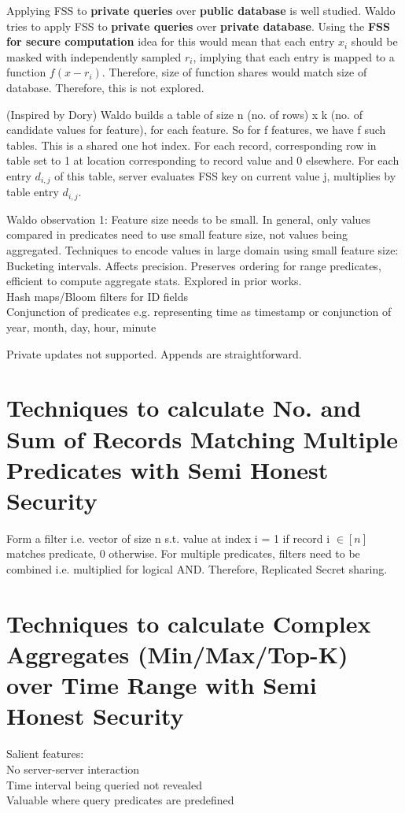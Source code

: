 Applying FSS to \textbf{private queries} over \textbf{public database} is well studied. Waldo tries to apply FSS to \textbf{private queries} over \textbf{private database}. Using the \textbf{FSS for secure computation} idea for this would mean that each entry $x_i$ should be masked with independently sampled $r_i$, implying that each entry is mapped to a function $f(x-r_i)$. Therefore, size of function shares would match size of database. Therefore, this is not explored.

(Inspired by Dory) Waldo builds a table of size n (no. of rows) x k (no. of candidate values for feature), for each feature. So for f features, we have f such tables. This is a shared one hot index. For each record, corresponding row in table set to 1 at location corresponding to record value and 0 elsewhere. For each entry $d_{i,j}$ of this table, server evaluates FSS key on current value j, multiplies by table entry $d_{i,j}$.

Waldo observation 1: Feature size needs to be small. In general, only values compared in predicates need to use small feature size, not values being aggregated. Techniques to encode values in large domain using small feature size: \\
\textbullet{} Bucketing intervals. Affects precision. Preserves ordering for range predicates, efficient to compute aggregate stats. Explored in prior works. \\
\textbullet{} Hash maps/Bloom filters for ID fields \\
\textbullet{} Conjunction of predicates e.g. representing time as timestamp or conjunction of year, month, day, hour, minute

Private updates not supported. Appends are straightforward.

\section{Techniques to calculate No. and Sum of Records Matching Multiple Predicates with Semi Honest Security}

Form a filter i.e. vector of size n s.t. value at index i = 1 if record i $\in [n]$ matches predicate, 0 otherwise. For multiple predicates, filters need to be combined i.e. multiplied for logical AND. Therefore, Replicated Secret sharing.


\section{Techniques to calculate Complex Aggregates (Min/Max/Top-K) over Time Range with Semi Honest Security}
Salient features:\\
\textbullet{} No server-server interaction \\
\textbullet{} Time interval being queried not revealed \\
\textbullet{} Valuable where query predicates are predefined \\

